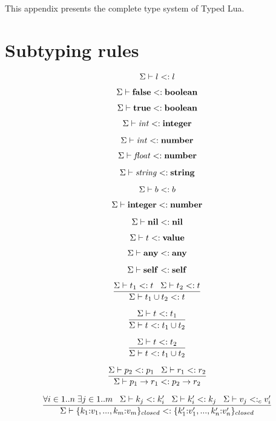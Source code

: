 This appendix presents the complete type system of Typed Lua.

\section{Subtyping rules}

\noindent

\[
\Sigma \vdash l <: l
\]

\[
\Sigma \vdash \mathbf{false} <: \mathbf{boolean}
\]

\[
\Sigma \vdash \mathbf{true} <: \mathbf{boolean}
\]

\[
\Sigma \vdash {\it int} <: \mathbf{integer}
\]

\[
\Sigma \vdash {\it int} <: \mathbf{number}
\]

\[
\Sigma \vdash {\it float} <: \mathbf{number}
\]

\[
\Sigma \vdash {\it string} <: \mathbf{string}
\]

\[
\Sigma \vdash b <: b
\]

\[
\Sigma \vdash \mathbf{integer} <: \mathbf{number}
\]

\[
\Sigma \vdash \mathbf{nil} <: \mathbf{nil}
\]

\[
\Sigma \vdash t <: \mathbf{value}
\]

\[
\Sigma \vdash \mathbf{any} <: \mathbf{any}
\]

\[
\Sigma \vdash \mathbf{self} <: \mathbf{self}
\]

\[
\dfrac{\Sigma \vdash t_{1} <: t \;\;\;
       \Sigma \vdash t_{2} <: t}
      {\Sigma \vdash t_{1} \cup t_{2} <: t}
\]

\[
\dfrac{\Sigma \vdash t <: t_{1}}
      {\Sigma \vdash t <: t_{1} \cup t_{2}}
\]

\[
\dfrac{\Sigma \vdash t <: t_{2}}
      {\Sigma \vdash t <: t_{1} \cup t_{2}}
\]

\[
\dfrac{\Sigma \vdash p_{2} <: p_{1} \;\;\;
       \Sigma \vdash r_{1} <: r_{2}}
      {\Sigma \vdash p_{1} \rightarrow r_{1} <: p_{2} \rightarrow r_{2}}
\]

\[
\dfrac{\forall i \in 1..n \; \exists j \in 1..m \;\;\;
       \Sigma \vdash k_{j} <: k_{i}' \;\;\;
       \Sigma \vdash k_{i}' <: k_{j} \;\;\;
       \Sigma \vdash v_{j} <:_{c} v_{i}'}
      {\Sigma \vdash \{k_{1}{:}v_{1}, ..., k_{m}{:}v_{m}\}_{closed} <: \{k_{1}'{:}v_{1}', ..., k_{n}'{:}v_{n}'\}_{closed}}
\]

